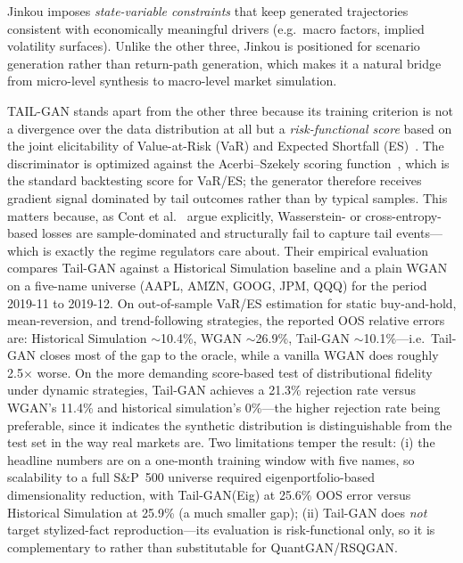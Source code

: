 Jinkou \citep{Jinkou} imposes \emph{state-variable constraints} that keep generated trajectories consistent with economically meaningful drivers (e.g.\ macro factors, implied volatility surfaces). Unlike the other three, Jinkou is positioned for scenario generation rather than return-path generation, which makes it a natural bridge from micro-level synthesis to macro-level market simulation.

TAIL-GAN \citep{cont2025tailgan} stands apart from the other three because its training criterion is not a divergence over the data distribution at all but a \emph{risk-functional score} based on the joint elicitability of Value-at-Risk (VaR) and Expected Shortfall (ES)~\citep{acerbi2002coherence,acerbi2014expected}. The discriminator is optimized against the Acerbi--Szekely scoring function~\citep{acerbi2014expected}, which is the standard backtesting score for VaR/ES; the generator therefore receives gradient signal dominated by tail outcomes rather than by typical samples. This matters because, as Cont et al.~\citep{cont2025tailgan} argue explicitly, Wasserstein- or cross-entropy-based losses are sample-dominated and structurally fail to capture tail events---which is exactly the regime regulators care about. Their empirical evaluation compares Tail-GAN against a Historical Simulation baseline and a plain WGAN on a five-name universe (AAPL, AMZN, GOOG, JPM, QQQ) for the period 2019-11 to 2019-12. On out-of-sample VaR/ES estimation for static buy-and-hold, mean-reversion, and trend-following strategies, the reported OOS relative errors are: Historical Simulation $\sim$10.4\%, WGAN $\sim$26.9\%, Tail-GAN $\sim$10.1\%---i.e.\ Tail-GAN closes most of the gap to the oracle, while a vanilla WGAN does roughly 2.5$\times$ worse. On the more demanding score-based test of distributional fidelity under dynamic strategies, Tail-GAN achieves a 21.3\% rejection rate versus WGAN's 11.4\% and historical simulation's 0\%---the higher rejection rate being preferable, since it indicates the synthetic distribution is distinguishable from the test set in the way real markets are. Two limitations temper the result: (i) the headline numbers are on a one-month training window with five names, so scalability to a full S\&P~500 universe required eigenportfolio-based dimensionality reduction, with Tail-GAN(Eig) at 25.6\% OOS error versus Historical Simulation at 25.9\% (a much smaller gap); (ii) Tail-GAN does \emph{not} target stylized-fact reproduction---its evaluation is risk-functional only, so it is complementary to rather than substitutable for QuantGAN/RSQGAN.

